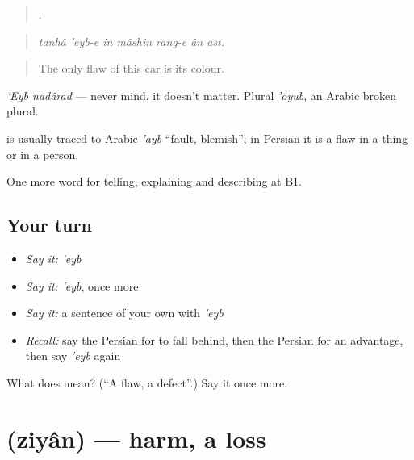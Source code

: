 \begin{quote}
      .
\end{quote}

\begin{quote}
\emph{tanhâ 'eyb-e in mâshin rang-e ân ast.}
\end{quote}

\begin{quote}
The only flaw of this car is its colour.
\end{quote}

\emph{'Eyb nadârad} — never mind, it doesn't matter. Plural \emph{'oyub}, an Arabic broken plural.

\begin{cousinweb}
\textbf{} is usually traced to Arabic \emph{'ayb} \textquotedblleft{}fault, blemish\textquotedblright{}; in Persian it is a flaw in a thing or in a person.
\end{cousinweb}

\begin{grammarlens}[title={What you've built}]
One more word for telling, explaining and describing at B1.
\end{grammarlens}

\subsection*{Your turn}
\begin{itemize}
\raggedright
  \item \emph{Say it:} \emph{'eyb}
  \item \emph{Say it:} \emph{'eyb}, once more
  \item \emph{Say it:} a sentence of your own with \emph{'eyb}
  \item \emph{Recall:} say the Persian for to fall behind, then the Persian for an advantage, then say \emph{'eyb} again
\end{itemize}

\begin{tcolorbox}[breakable,colback=teal!4,colframe=teal!35!black,title={Before you move on}]
What does  mean? (\textquotedblleft{}A flaw, a defect\textquotedblright{}.) Say it once more.
\end{tcolorbox}
\section[\texorpdfstring{\fa{زیان} (ziyân)}{زیان (ziyân)}]{ (ziyân) — harm, a loss}

